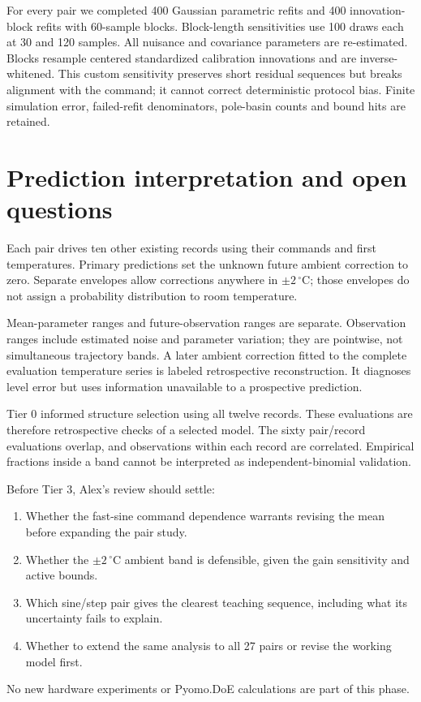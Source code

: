 \documentclass[10pt,letterpaper]{article}
\newcommand{\C}{\,^\circ\mathrm{C}}
\begin{document}
For every pair we completed 400 Gaussian parametric refits and 400 innovation-block refits with 60-sample blocks. Block-length sensitivities use 100 draws each at 30 and 120 samples. All nuisance and covariance parameters are re-estimated. Blocks resample centered standardized calibration innovations and are inverse-whitened. This custom sensitivity preserves short residual sequences but breaks alignment with the command; it cannot correct deterministic protocol bias. Finite simulation error, failed-refit denominators, pole-basin counts and bound hits are retained.

\section{Prediction interpretation and open questions}
Each pair drives ten other existing records using their commands and first temperatures. Primary predictions set the unknown future ambient correction to zero. Separate envelopes allow corrections anywhere in $\pm2\C$; those envelopes do not assign a probability distribution to room temperature.

Mean-parameter ranges and future-observation ranges are separate. Observation ranges include estimated noise and parameter variation; they are pointwise, not simultaneous trajectory bands. A later ambient correction fitted to the complete evaluation temperature series is labeled retrospective reconstruction. It diagnoses level error but uses information unavailable to a prospective prediction.

Tier 0 informed structure selection using all twelve records. These evaluations are therefore retrospective checks of a selected model. The sixty pair/record evaluations overlap, and observations within each record are correlated. Empirical fractions inside a band cannot be interpreted as independent-binomial validation.

Before Tier 3, Alex's review should settle:
\begin{enumerate}
\item Whether the fast-sine command dependence warrants revising the mean before expanding the pair study.
\item Whether the $\pm2\C$ ambient band is defensible, given the gain sensitivity and active bounds.
\item Which sine/step pair gives the clearest teaching sequence, including what its uncertainty fails to explain.
\item Whether to extend the same analysis to all 27 pairs or revise the working model first.
\end{enumerate}
No new hardware experiments or Pyomo.DoE calculations are part of this phase.
\end{document}
